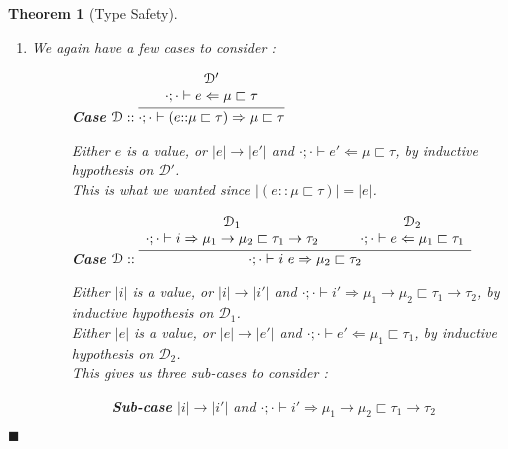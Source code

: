 \documentclass[letterpaper, 11pt]{article}
\newtheorem*{theorem}{Theorem}[section]
\newenvironment*{proof}{\par\noindent{\normalfont{\bf{Proof. \\ \hphantom{mm}
}}}}{\hfill \small$\blacksquare$\\[-4pt]}
\newcommand{\D}{\mathcal{D}}
\newcommand{\Rar}{\Rightarrow}
\newcommand{\Lar}{\Leftarrow}
\newcommand{\rar}{\rightarrow}
\begin{document}
\begin{theorem}[Type Safety]
\begin{proof}
\begin{enumerate}
\begin{description}
                TODO.  Missing a lemma : If $\cdot; \cdot \vdash i \Rar S[\Psi] \sqsubset A[\Psi]$, and 
                $\cdot; \cdot \vdash b \Lar_{S[\Psi] \sqsubset A[\Psi]} \mu \sqsubset \tau$, and $ (i \doteq b) \rar e$, then 
                $\cdot; \cdot \vdash e \Lar \mu \sqsubset \tau$.
            \end{description}
            
          \item We again have a few cases to consider :
           
            \begin{description}
              \item[] \textbf{Case} $\D :: \infer{\cdot ; \cdot \vdash (e {::} \mu \sqsubset \tau) \Rar \mu \sqsubset \tau}
                {
                  \begin{array}{c}
                    \D' \\
                    \cdot ; \cdot \vdash e \Lar \mu \sqsubset \tau
                  \end{array}
                }$

                Either $e$ is a value, or $|e| \rar |e'|$ and $\cdot; \cdot \vdash e' \Lar \mu \sqsubset \tau$, by inductive hypothesis on $\D'$. \\
                This is what we wanted since $|(e {::} \mu \sqsubset \tau)| = |e|$.

              \item[] \textbf{Case} $\D :: \infer{\cdot; \cdot \vdash i \ e \Rar \mu_2 \sqsubset \tau_2}
                {
                  \begin{array}{c}
                    \D_1 \\
                    \cdot; \cdot \vdash i \Rar \mu_1 \rar \mu_2 \sqsubset \tau_1 \rar \tau_2
                  \end{array}
                  &&
                  \begin{array}{c}
                    \D_2 \\
                    \cdot; \cdot \vdash e \Lar \mu_1 \sqsubset \tau_1
                  \end{array}
                }$

                Either $|i|$ is a value, or $|i| \rar |i'|$ and $\cdot; \cdot \vdash i' \Rar \mu_1 \rar \mu_2 \sqsubset \tau_1 \rar \tau_2$, by 
                inductive hypothesis on $\D_1$.  \\
                Either $|e|$ is a value, or $|e| \rar |e'|$ and $\cdot; \cdot \vdash e' \Lar \mu_1 \sqsubset \tau_1$, by inductive hypothesis on $\D_2$. \\
                This gives us three sub-cases to consider :
                \begin{description}
                  \item[] \textbf{Sub-case} $|i| \rar |i'|$ and $\cdot ; \cdot \vdash i' \Rar \mu_1 \rar \mu_2 \sqsubset \tau_1 \rar \tau_2$


\end{description}
\end{description}
\end{enumerate}
\end{proof}
\end{theorem}
\end{document}
